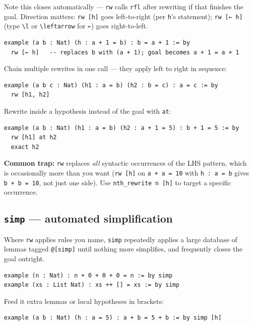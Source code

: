 Note this closes automatically --- \texttt{rw} calls \texttt{rfl} after rewriting if that finishes the goal. Direction matters: \texttt{rw [h]} goes left-to-right (per \texttt{h}'s statement); \texttt{rw [← h]} (type \texttt{\textbackslash{}l} or \texttt{\textbackslash{}leftarrow} for \texttt{←}) goes right-to-left.

\begin{verbatim}
example (a b : Nat) (h : a + 1 = b) : b = a + 1 := by
  rw [← h]   -- replaces b with (a + 1); goal becomes a + 1 = a + 1
\end{verbatim}

Chain multiple rewrites in one call --- they apply left to right in sequence:

\begin{verbatim}
example (a b c : Nat) (h1 : a = b) (h2 : b = c) : a = c := by
  rw [h1, h2]
\end{verbatim}

Rewrite inside a hypothesis instead of the goal with \texttt{at}:

\begin{verbatim}
example (a b : Nat) (h1 : a = b) (h2 : a + 1 = 5) : b + 1 = 5 := by
  rw [h1] at h2
  exact h2
\end{verbatim}

\textbf{Common trap:} \texttt{rw} replaces \emph{all} syntactic occurrences of the LHS pattern, which is occasionally more than you want (\texttt{rw [h]} on \texttt{a + a = 10} with \texttt{h : a = b} gives \texttt{b + b = 10}, not just one side). Use \texttt{nth\_rewrite n [h]} to target a specific occurrence.

\subsection{\texttt{simp} --- automated simplification}

Where \texttt{rw} applies rules you name, \texttt{simp} repeatedly applies a large database of lemmas tagged \texttt{@[simp]} until nothing more simplifies, and frequently closes the goal outright.

\begin{verbatim}
example (n : Nat) : n + 0 + 0 + 0 = n := by simp
example (xs : List Nat) : xs ++ [] = xs := by simp
\end{verbatim}

Feed it extra lemmas or local hypotheses in brackets:

\begin{verbatim}
example (a b : Nat) (h : a = 5) : a + b = 5 + b := by simp [h]
\end{verbatim}

